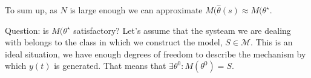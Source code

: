 To sum up, as $N$ is large enough we can approximate $M(\hat{\theta}(s)\approx M(\theta ^{\star}$.

Question: is $M(\theta^{\star}$ satisfactory? Let's assume that the systeam we are dealing with belongs to the class in which we construct the model, $S\in \mathcal{M}$. This is an ideal situation, we have enough degrees of freedom to describe the mechanism by which $y(t)$ is generated. That means that $\exists\theta^{0}: M(\theta^{0}) = S$.